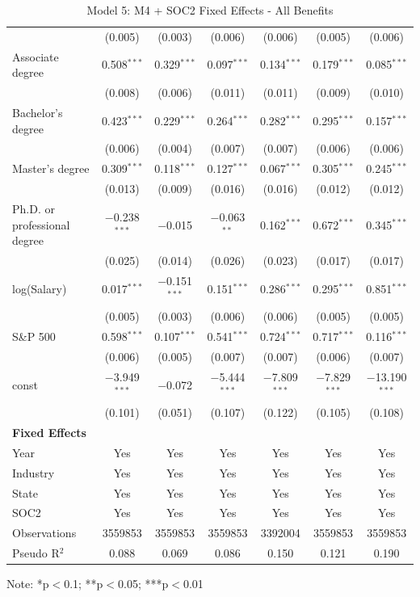 \begin{table}[!htbp]
\begin{tabular}{lcccccc}
 & (0.005) & (0.003) & (0.006) & (0.006) & (0.005) & (0.006) \\
\quad Associate degree & 0.508$^{***}$ & 0.329$^{***}$ & 0.097$^{***}$ & 0.134$^{***}$ & 0.179$^{***}$ & 0.085$^{***}$ \\
 & (0.008) & (0.006) & (0.011) & (0.011) & (0.009) & (0.010) \\
\quad Bachelor's degree & 0.423$^{***}$ & 0.229$^{***}$ & 0.264$^{***}$ & 0.282$^{***}$ & 0.295$^{***}$ & 0.157$^{***}$ \\
 & (0.006) & (0.004) & (0.007) & (0.007) & (0.006) & (0.006) \\
\quad Master's degree & 0.309$^{***}$ & 0.118$^{***}$ & 0.127$^{***}$ & 0.067$^{***}$ & 0.305$^{***}$ & 0.245$^{***}$ \\
 & (0.013) & (0.009) & (0.016) & (0.016) & (0.012) & (0.012) \\
\quad Ph.D. or professional degree & $-$0.238$^{***}$ & $-$0.015 & $-$0.063$^{**}$ & 0.162$^{***}$ & 0.672$^{***}$ & 0.345$^{***}$ \\
 & (0.025) & (0.014) & (0.026) & (0.023) & (0.017) & (0.017) \\
log(Salary) & 0.017$^{***}$ & $-$0.151$^{***}$ & 0.151$^{***}$ & 0.286$^{***}$ & 0.295$^{***}$ & 0.851$^{***}$ \\
 & (0.005) & (0.003) & (0.006) & (0.006) & (0.005) & (0.005) \\
S\&P 500 & 0.598$^{***}$ & 0.107$^{***}$ & 0.541$^{***}$ & 0.724$^{***}$ & 0.717$^{***}$ & 0.116$^{***}$ \\
 & (0.006) & (0.005) & (0.007) & (0.007) & (0.006) & (0.007) \\
const & $-$3.949$^{***}$ & $-$0.072 & $-$5.444$^{***}$ & $-$7.809$^{***}$ & $-$7.829$^{***}$ & $-$13.190$^{***}$ \\
 & (0.101) & (0.051) & (0.107) & (0.122) & (0.105) & (0.108) \\
\midrule
\textbf{Fixed Effects} &  &  &  &  &  &  \\
\quad Year & Yes & Yes & Yes & Yes & Yes & Yes \\
\quad Industry & Yes & Yes & Yes & Yes & Yes & Yes \\
\quad State & Yes & Yes & Yes & Yes & Yes & Yes \\
\quad SOC2 & Yes & Yes & Yes & Yes & Yes & Yes \\
\midrule
Observations & 3559853 & 3559853 & 3559853 & 3392004 & 3559853 & 3559853 \\
Pseudo R$^2$ & 0.088 & 0.069 & 0.086 & 0.150 & 0.121 & 0.190 \\
\bottomrule
\end{tabular}
\caption{Model 5: M4 + SOC2 Fixed Effects - All Benefits}
\label{tab:m5_all_benefits}
\begin{tablenotes}
\small
\item Note: *p$<$0.1; **p$<$0.05; ***p$<$0.01
\end{tablenotes}
\end{table}

